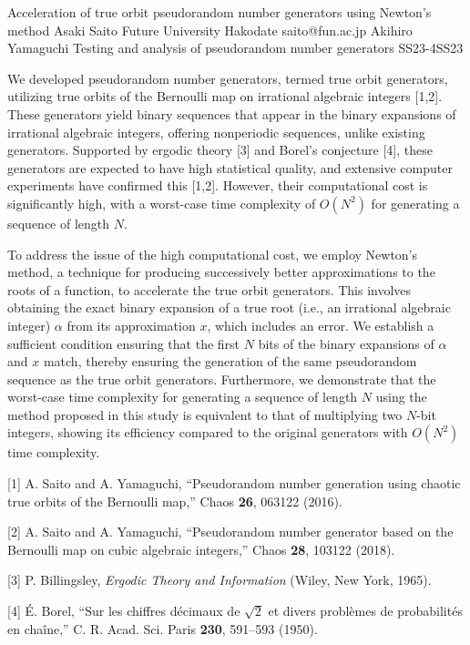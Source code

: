 \begin{talk}
  {Acceleration of true orbit pseudorandom number generators using Newton's method}%
  {Asaki Saito}%
  {Future University Hakodate}%
  {saito@fun.ac.jp}%
  {Akihiro Yamaguchi}%
{Testing and analysis of pseudorandom number generators}
{}{SS23-4}{SS23}


We developed pseudorandom number generators, termed true orbit
generators, utilizing true orbits of the Bernoulli map on irrational
algebraic integers [1,2].
These generators yield binary sequences that appear in the binary
expansions of irrational algebraic integers, offering nonperiodic
sequences, unlike existing generators.
Supported by ergodic theory [3] and Borel's conjecture [4], these
generators are expected to have high statistical quality, and
extensive computer experiments have confirmed this [1,2].
However, their computational cost is significantly high, with a
worst-case time complexity of $O(N^2)$ for generating a sequence of
length $N$.

To address the issue of the high computational cost, we employ Newton's method, a technique for
producing successively better approximations to the roots of a
function, to accelerate the true orbit generators.
This involves obtaining the exact binary expansion of a true root
(i.e., an irrational algebraic integer) $\alpha$ from its
approximation $x$, which includes an error.
We establish a sufficient condition ensuring that the first $N$ bits
of the binary expansions of $\alpha$ and $x$ match, thereby ensuring
the generation of the same pseudorandom sequence as the true orbit
generators.
Furthermore, we demonstrate that the worst-case time complexity for
generating a sequence of length $N$ using the method proposed in this
study is equivalent to that of multiplying two $N$-bit integers,
showing its efficiency compared to the original generators with
$O(N^2)$ time complexity.

\medskip

[1] A. Saito and A. Yamaguchi,
``Pseudorandom number generation using chaotic true orbits of the Bernoulli map,''
Chaos {\bf 26}, 063122 (2016).

[2] A. Saito and A. Yamaguchi,
``Pseudorandom number generator based on the Bernoulli map on cubic algebraic integers,''
Chaos {\bf 28}, 103122 (2018).

[3] P. Billingsley,
{\it Ergodic Theory and Information}
(Wiley, New York, 1965).

[4] \'{E}. Borel,
``Sur les chiffres d\'{e}cimaux de $\sqrt{2}$ et divers probl\`{e}mes de
probabilit\'{e}s en cha\^{i}ne,''
C. R. Acad. Sci. Paris {\bf 230}, 591--593 (1950).
\end{talk}

